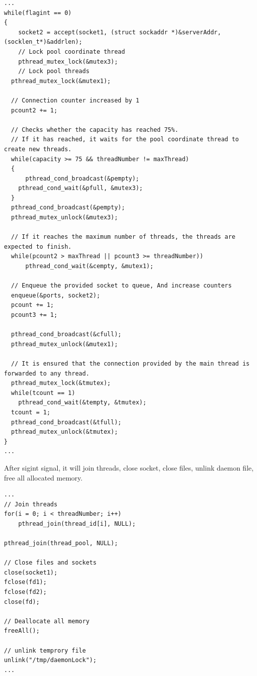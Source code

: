 \documentclass{article}
\begin{document}
\begin{lstlisting}[style=CStyle]
...
while(flagint == 0)
{
    socket2 = accept(socket1, (struct sockaddr *)&serverAddr, (socklen_t*)&addrlen);
    // Lock pool coordinate thread
    pthread_mutex_lock(&mutex3);
    // Lock pool threads
  pthread_mutex_lock(&mutex1);
  
  // Connection counter increased by 1
  pcount2 += 1;
  
  // Checks whether the capacity has reached 75%.
  // If it has reached, it waits for the pool coordinate thread to create new threads.
  while(capacity >= 75 && threadNumber != maxThread)
  {
      pthread_cond_broadcast(&pempty);
    pthread_cond_wait(&pfull, &mutex3);
  }
  pthread_cond_broadcast(&pempty);
  pthread_mutex_unlock(&mutex3);
  
  // If it reaches the maximum number of threads, the threads are expected to finish.
  while(pcount2 > maxThread || pcount3 >= threadNumber))
      pthread_cond_wait(&cempty, &mutex1);
      
  // Enqueue the provided socket to queue, And increase counters
  enqueue(&ports, socket2);
  pcount += 1;
  pcount3 += 1;

  pthread_cond_broadcast(&cfull);
  pthread_mutex_unlock(&mutex1);
  
  // It is ensured that the connection provided by the main thread is forwarded to any thread.
  pthread_mutex_lock(&tmutex);
  while(tcount == 1)
    pthread_cond_wait(&tempty, &tmutex);
  tcount = 1;
  pthread_cond_broadcast(&tfull);
  pthread_mutex_unlock(&tmutex);
}
...
\end{lstlisting}
\noindent After sigint signal, it will join threads, close socket, close files, unlink daemon file, free all allocated memory.
\begin{lstlisting}[style=CStyle]
...
// Join threads
for(i = 0; i < threadNumber; i++)
    pthread_join(thread_id[i], NULL);
    
pthread_join(thread_pool, NULL);

// Close files and sockets
close(socket1);
fclose(fd1);
fclose(fd2);
close(fd);

// Deallocate all memory
freeAll();

// unlink temprory file
unlink("/tmp/daemonLock");
...
\end{lstlisting}
\end{document}
